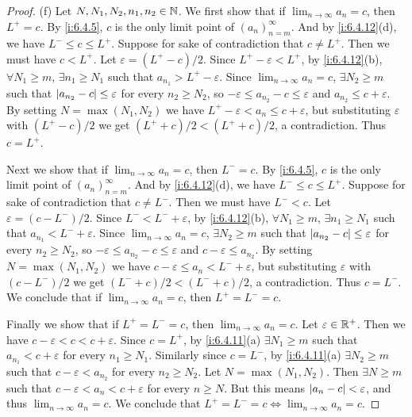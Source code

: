\begin{proof}{(f)}
  Let \(N, N_1, N_2, n_1, n_2 \in \mathbb{N}\).
  We first show that if \(\lim_{n \to \infty} a_n = c\), then \(L^+ = c\).
  By \cref{i:6.4.5}, \(c\) is the only limit point of \((a_n)_{n = m}^\infty\).
  And by \cref{i:6.4.12}(d), we have \(L^- \leq c \leq L^+\).
  Suppose for sake of contradiction that \(c \neq L^+\).
  Then we must have \(c < L^+\).
  Let \(\varepsilon = (L^+ - c) / 2\).
  Since \(L^+ - \varepsilon < L^+\), by \cref{i:6.4.12}(b), \(\forall N_1 \geq m\), \(\exists n_1 \geq N_1\) such that \(a_{n_1} > L^+ - \varepsilon\).
  Since \(\lim_{n \to \infty} a_n = c\), \(\exists N_2 \geq m\) such that \(\left\lvert a_{n_2} - c\right\rvert \leq \varepsilon\) for every \(n_2 \geq N_2\), so \(-\varepsilon \leq a_{n_2} - c \leq \varepsilon\) and \(a_{n_2} \leq c + \varepsilon\).
  By setting \(N = \max(N_1, N_2)\) we have \(L^+ - \varepsilon < a_n \leq c + \varepsilon\), but substituting \(\varepsilon\) with \((L^+ - c) / 2\) we get \((L^+ + c) / 2 < (L^+ + c) / 2\), a contradiction.
  Thus \(c = L^+\).

  Next we show that if \(\lim_{n \to \infty} a_n = c\), then \(L^- = c\).
  By \cref{i:6.4.5}, \(c\) is the only limit point of \((a_n)_{n = m}^\infty\).
  And by \cref{i:6.4.12}(d), we have \(L^- \leq c \leq L^+\).
  Suppose for sake of contradiction that \(c \neq L^-\).
  Then we must have \(L^- < c\).
  Let \(\varepsilon = (c - L^-) / 2\).
  Since \(L^- < L^- + \varepsilon\), by \cref{i:6.4.12}(b), \(\forall N_1 \geq m\), \(\exists n_1 \geq N_1\) such that \(a_{n_1} < L^- + \varepsilon\).
  Since \(\lim_{n \to \infty} a_n = c\), \(\exists N_2 \geq m\) such that \(\left\lvert a_{n_2} - c\right\rvert \leq \varepsilon\) for every \(n_2 \geq N_2\), so \(-\varepsilon \leq a_{n_2} - c \leq \varepsilon\) and \(c - \varepsilon \leq a_{n_2}\).
  By setting \(N = \max(N_1, N_2)\) we have \(c - \varepsilon \leq a_n < L^- + \varepsilon\), but substituting \(\varepsilon\) with \((c - L^-) / 2\) we get \((L^- + c) / 2 < (L^- + c) / 2\), a contradiction.
  Thus \(c = L^-\).
  We conclude that if \(\lim_{n \to \infty} a_n = c\), then \(L^+ = L^- = c\).

  Finally we show that if \(L^+ = L^- = c\), then \(\lim_{n \to \infty} a_n = c\).
  Let \(\varepsilon \in \mathbb{R}^+\).
  Then we have \(c - \varepsilon < c < c + \varepsilon\).
  Since \(c = L^+\), by \cref{i:6.4.11}(a) \(\exists N_1 \geq m\) such that \(a_{n_1} < c + \varepsilon\) for every \(n_1 \geq N_1\).
  Similarly since \(c = L^-\), by \cref{i:6.4.11}(a) \(\exists N_2 \geq m\) such that \(c - \varepsilon < a_{n_2}\) for every \(n_2 \geq N_2\).
  Let \(N = \max(N_1, N_2)\).
  Then \(\exists N \geq m\) such that \(c - \varepsilon < a_n < c + \varepsilon\) for every \(n \geq N\).
  But this means \(\left\lvert a_n - c\right\rvert < \varepsilon\), and thus \(\lim_{n \to \infty} a_n = c\).
  We conclude that \(L^+ = L^- = c \iff \lim_{n \to \infty} a_n = c\).
\end{proof}

